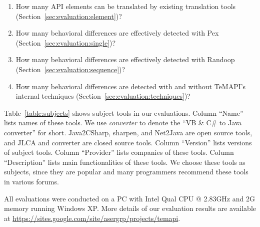 \begin{enumerate}
\item How many API elements can be translated by existing translation tools (Section~\ref{sec:evaluation:element})? %
\item How many behavioral differences are effectively detected with Pex (Section~\ref{sec:evaluation:single})?%
\item How many behavioral differences are effectively detected with Randoop (Section~\ref{sec:evaluation:sequence})?%
\item How many behavioral differences are detected with and without TeMAPI's internal techniques (Section~\ref{sec:evaluation:techniques})?
\end{enumerate}%

Table~\ref{table:subjects} shows subject tools in our evaluations. Column ``Name'' lists names of these tools. We use \emph{converter} to denote the ``VB \& C\# to Java converter'' for short. Java2CSharp, sharpen, and Net2Java are open source tools, and JLCA and converter are closed source tools. Column ``Version'' lists versions of subject tools. Column ``Provider'' lists companies of these tools. Column ``Description'' lists main functionalities of these tools. We choose these tools as subjects, since they are popular and many programmers recommend these tools in various forums.

All evaluations were conducted on a PC with Intel Qual CPU @ 2.83GHz and 2G memory running Windows XP. More details
of our evaluation results are available at \url{https://sites.google.com/site/asergrp/projects/temapi}.


